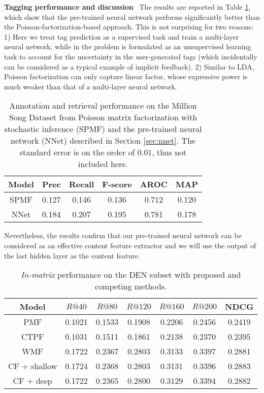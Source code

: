 \vspace{0.1in}
\noindent\textbf{Tagging performance and discussion}~
The results are reported in Table \ref{tab:tag}, which show that the pre-trained neural network performs significantly better than the Poisson-factorization-based approach. This is not surprising for two reasons: 1) Here we treat tag prediction as a supervised task and train a multi-layer neural network, while in \cite{liang2014codebook} the problem is formulated as an unsupervised learning task to account for the uncertainty in the user-generated tags (which incidentally can be considered as a typical example of implicit feedback). 2) Similar to LDA, Poisson factorization can only capture linear factor, whose expressive power is much weaker than that of a multi-layer neural network. 

\begin{table}
\centering
  \begin{tabular}{ c | c  c  c | c  c }
    \hline
    Model & Prec & Recall & F-score & AROC & MAP \\ \hline
     SPMF & 0.127  &  0.146 & 0.136 & 0.712 & 0.120 \\
     NNet &  0.184 & 0.207   &  0.195  & 0.781  & 0.178 \\
    \hline
  \end{tabular}
  \caption{Annotation and retrieval performance on the Million Song Dataset from Poisson matrix factorization with stochastic inference (SPMF) \cite{liang2014codebook} and the pre-trained neural network (NNet) described in Section \ref{sec:nnet}. The standard error is on the order of $0.01$, thus not included here.} 
  \label{tab:tag}
\end{table}

Nevertheless, the results confirm that our pre-trained neural network can be considered as an effective content feature extractor and we will use the output of the last hidden layer as the content feature. 

\begin{table*}
\centering
  \begin{tabular}{ c | c  c  c  c c  | c  }
    \hline
    Model & $R@40$  & $R@80$  & $R@120$  & $R@160$ & $R@200$ & NDCG \\ \hline
     PMF \cite{gopalan2013scalable} & 0.1021 & 0.1533 &  0.1908 & 0.2206 & 0.2456 & 0.2419 \\
     CTPF \cite{gopalan2014content} &  0.1031 & 0.1511  & 0.1861  & 0.2138  & 0.2370 & 0.2395 \\
     WMF \cite{hu2008collaborative} & 0.1722  &  0.2367 & 0.2803 & 0.3133 & 0.3397 & 0.2881 \\
     CF + shallow & 0.1724 & 0.2368 & 0.2803 & 0.3131 & 0.3396 & 0.2883\\
     CF + deep & {0.1722} & {0.2365} & {0.2800} & {0.3129} & {0.3394} & {0.2882} \\
    \hline
  \end{tabular}
  \caption{\emph{In-matrix} performance on the DEN subset with proposed and competing methods. } 
  \label{tab:in-matrix}
\end{table*}

